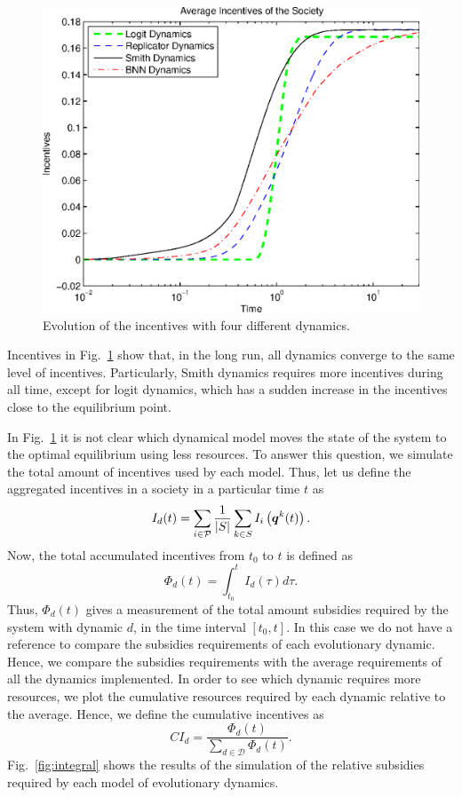 \begin{figure}[hbt]
 \centering
 \includegraphics[width=.75\textwidth]{./images/evolution_i.eps}
 \caption{Evolution of the incentives with four different dynamics.}
 \label{fig:dynamics_i}
\end{figure}



Incentives in Fig.~\ref{fig:dynamics_i} show that, in the long run, all dynamics converge to the same level of incentives. Particularly, Smith dynamics requires more incentives during all time, except for logit dynamics, which has a sudden increase in the incentives close to the equilibrium point. 

In Fig.~\ref{fig:dynamics_i} it is not clear which dynamical model moves the state of the system to the optimal equilibrium using less resources. To answer this question, we simulate the total amount of incentives used by each model.
Thus, let us define the aggregated incentives in a society in a particular time $t$ as
\begin{equation}
 I_d (t) = \sum_{i\in\mathcal{P}} \frac{1}{|S|} \sum_{k\in S} I_i \left( \boldsymbol{q}^k (t) \right).
\end{equation}
Now, the total accumulated incentives from $t_0$ to $t$ is defined as 
\begin{equation}
 \varPhi_d (t) = \int_{t_0}^t I_d (\tau) d\tau.
\end{equation}
Thus, $\varPhi_d (t)$ gives a measurement of the total amount subsidies required by the system with dynamic $d$, in the time interval  $[t_0, t]$.
In this case we do not have a reference to compare the subsidies requirements of each evolutionary dynamic. Hence, we compare the subsidies requirements with the average requirements of all the dynamics implemented. 
%
In order to see which dynamic requires more resources, we plot the cumulative resources required by each dynamic relative to the average.
Hence, we define the cumulative incentives as 
%
\begin{equation}
CI_d = \frac{ \varPhi_d (t) }{ \sum_{d\in \mathcal{D}} \varPhi_d (t) }.
\end{equation}
%
Fig.~\ref{fig:integral} shows the results of the simulation of the relative subsidies required by each model of evolutionary dynamics.
%



